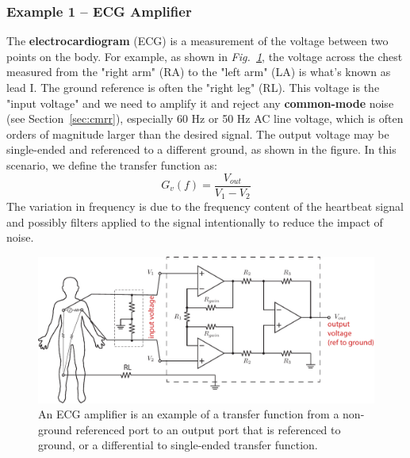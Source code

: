 \subsubsection{Example 1 – ECG Amplifier}
The \textbf{electrocardiogram} (ECG) is a measurement of the voltage between two points on the body.  For example, as shown in \emph{Fig.~\ref{fig:ecg}}, the voltage across the chest measured from the "right arm" (RA) to the "left arm" (LA) is what's known as lead I.  The ground reference is often the "right leg" (RL).  This voltage is the "input voltage" and we need to amplify it and reject any \textbf{common-mode} noise (see Section~\ref{sec:cmrr}), especially 60 Hz or 50 Hz AC line voltage, which is often orders of magnitude larger than the desired signal.  The output voltage may be single-ended and referenced to a different ground, as shown in the figure.  In this scenario, we define the transfer function as:
    \begin{equation}
        G_v(f) = \frac{V_{out}}{V_1 - V_2 }
    \end{equation}
The variation in frequency is due to the frequency content of the heartbeat signal and possibly filters applied to the signal intentionally to reduce the impact of noise.
\begin{figure}[tb]
\centering
\includegraphics[width=\columnwidth]{ex_opamp-ia2}
\caption{An ECG amplifier is an example of a transfer function from a non-ground referenced port to an output port that is referenced to ground, or a differential to single-ended transfer function.}
\label{fig:ecg}
\end{figure}
